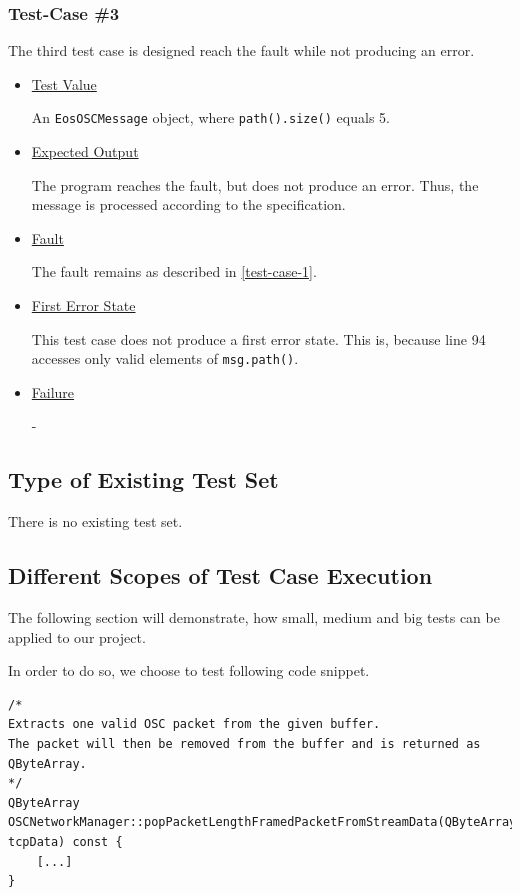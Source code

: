 \documentclass{scrreprt}
\begin{document}
\subsubsection{Test-Case \#3}
\label{test-case-3}

The third test case is designed reach the fault while not producing an error.

\begin{itemize}
	\item[] \underline{Test Value}
	
	An \texttt{EosOSCMessage} object, where \texttt{path().size()} equals 5.
	
	\item[] \underline{Expected Output}
	
	The program reaches the fault, but does not produce an error. Thus, the message is processed according to the specification.
	
	\item[] \underline{Fault}
	
	The fault remains as described in \vref{test-case-1}. 
	
	\item[] \underline{First Error State}
	
	This test case does not produce a first error state. This is, because line 94 accesses only valid elements of \texttt{msg.path()}.
	
	\item[] \underline{Failure}
	
	-
\end{itemize}

\subsection{Type of Existing Test Set}

There is no existing test set.

\subsection{Different Scopes of Test Case Execution}

The following section will demonstrate, how small, medium and big tests can be applied to our project.

In order to do so, we choose to test following code snippet.

\begin{lstlisting}[title=src/OSCNetworkManager.cpp]
/*
Extracts one valid OSC packet from the given buffer. 
The packet will then be removed from the buffer and is returned as QByteArray.
*/
QByteArray OSCNetworkManager::popPacketLengthFramedPacketFromStreamData(QByteArray& tcpData) const {
	[...]
}
\end{lstlisting}
\bigskip
\end{document}
